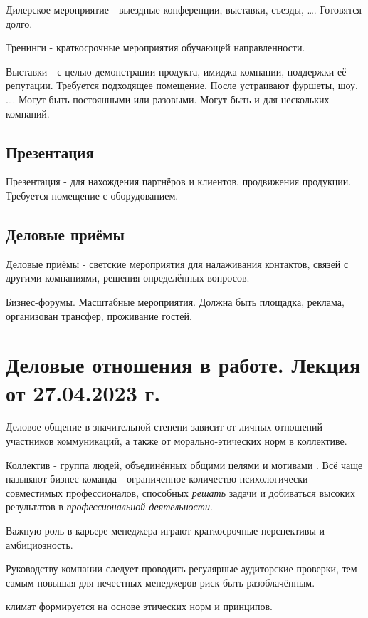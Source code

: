 Дилерское мероприятие - выездные конференции, выставки, съезды, \missed{}\dots. Готовятся долго.

Тренинги - краткосрочные мероприятия обучающей направленности.

Выставки - с целью демонстрации продукта, имиджа компании, поддержки её репутации. Требуется подходящее помещение. После устраивают фуршеты, шоу, \dots. Могут быть постоянными или разовыми. Могут быть и для нескольких компаний.

\subsection{Презентация}

Презентация - для нахождения партнёров и клиентов, продвижения продукции. Требуется помещение с оборудованием.

\subsection{Деловые приёмы}

Деловые приёмы - светские мероприятия для налаживания контактов, связей с другими компаниями, решения определённых вопросов.

Бизнес-форумы. Масштабные мероприятия. Должна быть площадка, реклама, организован трансфер, проживание гостей.

\section{Деловые отношения в работе. Лекция от 27.04.2023 г.}

Деловое общение в значительной степени зависит от личных отношений участников коммуникаций, а также от морально-этических норм в коллективе.

Коллектив - группа людей, объединённых общими целями и мотивами \missed{}. Всё чаще называют бизнес-команда - ограниченное количество психологически совместимых профессионалов, способных \textit{решать} задачи и добиваться высоких результатов в \textit{профессиональной деятельности}.

Важную роль в карьере менеджера играют краткосрочные перспективы и амбициозность.

Руководству компании следует проводить регулярные аудиторские проверки, тем самым повышая для нечестных менеджеров риск быть разоблачённым.

\missed{} климат формируется на основе этических норм и принципов.

